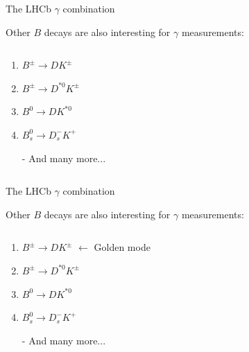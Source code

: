 \documentclass[dvipsnames]{beamer}
\begin{document}
\begin{frame}{The LHCb $\gamma$ combination}
  \begin{center}
    \Large Other $B$ decays are also interesting for $\gamma$ measurements:
  \end{center}
  \vspace{0.2cm}
  \begin{columns}
    \begin{column}{0.6\textwidth}
      \vspace{1.5cm}
      \begin{enumerate}
        \item{$B^\pm\to DK^\pm$}
        \item{$B^\pm\to D^{*0}K^\pm$}
        \item{$B^0\to DK^{*0}$}
        \item{$B_s^0\to D_s^-K^+$}
        \item[-]{And many more...}
      \end{enumerate}
      \vspace{1.5cm}
    \end{column}
    \begin{column}{0.4\textwidth}
    \end{column}
  \end{columns}
\end{frame}

\begin{frame}{The LHCb $\gamma$ combination}
  \begin{center}
    \Large Other $B$ decays are also interesting for $\gamma$ measurements:
  \end{center}
  \vspace{0.2cm}
  \begin{columns}
    \begin{column}{0.6\textwidth}
      \vspace{1.5cm}
      \begin{enumerate}
        \item{$B^\pm\to DK^\pm$ $\leftarrow$ Golden mode}
        \item{$B^\pm\to D^{*0}K^\pm$}
        \item{$B^0\to DK^{*0}$}
        \item{$B_s^0\to D_s^-K^+$}
        \item[-]{And many more...}
      \end{enumerate}
      \vspace{1.5cm}
    \end{column}
    \begin{column}{0.4\textwidth}
    \end{column}
  \end{columns}
\end{frame}
\end{document}
